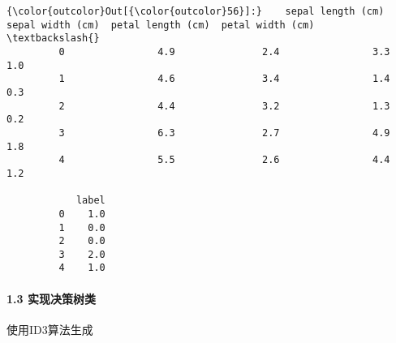 \documentclass[11pt]{article}
\begin{document}
\begin{Verbatim}[commandchars=\\\{\}]
{\color{outcolor}Out[{\color{outcolor}56}]:}    sepal length (cm)  sepal width (cm)  petal length (cm)  petal width (cm)  \textbackslash{}
         0                4.9               2.4                3.3               1.0   
         1                4.6               3.4                1.4               0.3   
         2                4.4               3.2                1.3               0.2   
         3                6.3               2.7                4.9               1.8   
         4                5.5               2.6                4.4               1.2   
         
            label  
         0    1.0  
         1    0.0  
         2    0.0  
         3    2.0  
         4    1.0  
\end{Verbatim}
            
    \paragraph{1.3 实现决策树类}\label{ux5b9eux73b0ux51b3ux7b56ux6811ux7c7b}

使用ID3算法生成
\end{document}
